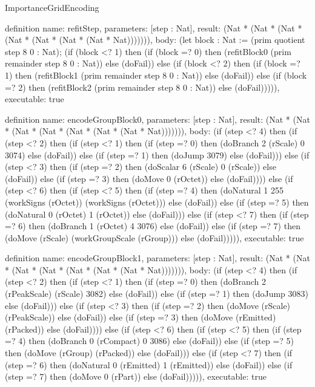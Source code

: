 \begin{lexlean}{ImportanceGridEncoding}
\begin{semanticmodule}
definition{
  name: refitStep,
  parameters: [step : Nat],
  result: (Nat * (Nat * (Nat * (Nat * (Nat * (Nat * (Nat * Nat))))))),
  body: (let block : Nat := (prim quotient step 8 0 : Nat); (if (block <? 1) then
      (if (block =? 0) then (refitBlock0 (prim remainder step 8 0 : Nat)) else (doFail)) else
      (if (block <? 2) then
      (if (block =? 1) then (refitBlock1 (prim remainder step 8 0 : Nat)) else (doFail)) else
      (if (block =? 2) then (refitBlock2 (prim remainder step 8 0 : Nat)) else (doFail))))),
  executable: true
}

definition{
  name: encodeGroupBlock0,
  parameters: [step : Nat],
  result: (Nat * (Nat * (Nat * (Nat * (Nat * (Nat * (Nat * Nat))))))),
  body: (if (step <? 4) then
      (if (step <? 2) then
      (if (step <? 1) then
      (if (step =? 0) then (doBranch 2 (rScale) 0 3074) else (doFail)) else
      (if (step =? 1) then (doJump 3079) else (doFail))) else
      (if (step <? 3) then
      (if (step =? 2) then (doScalar 6 (rScale) 0 (rScale)) else (doFail)) else
      (if (step =? 3) then (doMove 0 (rOctet)) else (doFail)))) else
      (if (step <? 6) then
      (if (step <? 5) then
      (if (step =? 4) then (doNatural 1 255 (workSigns (rOctet)) (workSigns (rOctet))) else (doFail)) else
      (if (step =? 5) then (doNatural 0 (rOctet) 1 (rOctet)) else (doFail))) else
      (if (step <? 7) then
      (if (step =? 6) then (doBranch 1 (rOctet) 4 3076) else (doFail)) else
      (if (step =? 7) then (doMove (rScale) (workGroupScale (rGroup))) else (doFail))))),
  executable: true
}

definition{
  name: encodeGroupBlock1,
  parameters: [step : Nat],
  result: (Nat * (Nat * (Nat * (Nat * (Nat * (Nat * (Nat * Nat))))))),
  body: (if (step <? 4) then
      (if (step <? 2) then
      (if (step <? 1) then
      (if (step =? 0) then (doBranch 2 (rPeakScale) (rScale) 3082) else (doFail)) else
      (if (step =? 1) then (doJump 3083) else (doFail))) else
      (if (step <? 3) then
      (if (step =? 2) then (doMove (rScale) (rPeakScale)) else (doFail)) else
      (if (step =? 3) then (doMove (rEmitted) (rPacked)) else (doFail)))) else
      (if (step <? 6) then
      (if (step <? 5) then
      (if (step =? 4) then (doBranch 0 (rCompact) 0 3086) else (doFail)) else
      (if (step =? 5) then (doMove (rGroup) (rPacked)) else (doFail))) else
      (if (step <? 7) then
      (if (step =? 6) then (doNatural 0 (rEmitted) 1 (rEmitted)) else (doFail)) else
      (if (step =? 7) then (doMove 0 (rPart)) else (doFail))))),
  executable: true
}


\end{semanticmodule}
\end{lexlean}
